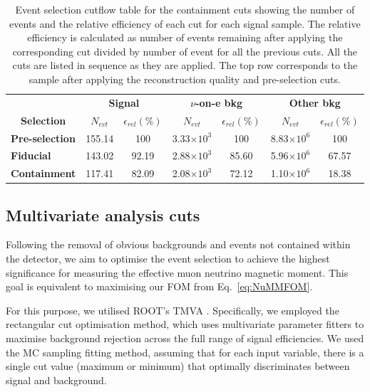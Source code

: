 \begin{table}[!hb]
\centering
\caption[Event selection cutflow table for the containment cuts]{Event selection cutflow table for the containment cuts showing the number of events and the relative efficiency of each cut for each signal sample. The relative efficiency is calculated as number of events remaining after applying the corresponding cut divided by number of event for all the previous cuts. All the cuts are listed in sequence as they are applied. The top row corresponds to the sample after applying the reconstruction quality and pre-selection cuts.}
\begin{tabular}{|l|cc|cc|cc|}\hline
\multicolumn{1}{|c|}{} & \multicolumn{2}{c|}{\textbf{Signal}} & \multicolumn{2}{c|}{\textbf{$\nu$-on-e bkg}} & \multicolumn{2}{c|}{\textbf{Other bkg}} \\
\multicolumn{1}{|c|}{\multirow{-2}{*}{\textbf{Selection}}} & \textbf{$N_{evt}$} & \textbf{$\epsilon_{rel}\left(\%\right)$} & \textbf{$N_{evt}$} & \textbf{$\epsilon_{rel}\left(\%\right)$}  & \textbf{$N_{evt}$} & \textbf{$\epsilon_{rel}\left(\%\right)$}\\\hline
\textbf{Pre-selection} & 155.14 & 100 & 3.33$\times 10^3$ & 100 & 8.83$\times 10^6$ & 100\\
\textbf{Fiducial} & 143.02 & 92.19 & 2.88$\times 10^3$ & 85.60 & 5.96$\times 10^6$ & 67.57\\
\textbf{Containment} & 117.41 & 82.09 & 2.08$\times 10^3$ & 72.12 & 1.10$\times 10^6$ & 18.38\\\hline
\end{tabular}
\label{tab:CutflowTableFiducialContainmnet}
\end{table}

\subsection{Multivariate analysis cuts}\label{sec:NuMMEventSelTMVA}
Following the removal of obvious backgrounds and events not contained within the detector, we aim to optimise the event selection to achieve the highest significance for measuring the effective muon neutrino magnetic moment. This goal is equivalent to maximising our \gls{FOM} from Eq.~\ref{eq:NuMMFOM}.

For this purpose, we utilised ROOT's \cite{ROOT} \gls{TMVA} \cite{TMVA}. Specifically, we employed the rectangular cut optimisation method, which uses multivariate parameter fitters to maximise background rejection across the full range of signal efficiencies. We used the \gls{MC} sampling fitting method, assuming that for each input variable, there is a single cut value (maximum or minimum) that optimally discriminates between signal and background.

